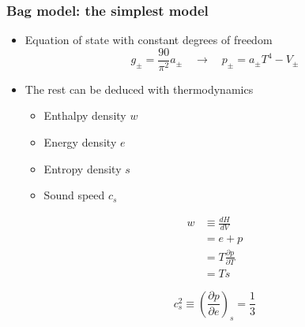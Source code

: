 \begin{frame}
    \frametitle{Bag model: the simplest model}
    \begin{itemize}
        \item Equation of state with constant degrees of freedom
        \begin{equation}
            g_\pm = \frac{90}{\pi^2} a_\pm \quad \rightarrow \quad p_\pm = a_\pm T^4 - V_\pm
        \end{equation}
        \item The rest can be deduced with thermodynamics \\
        \begin{minipage}[t]{0.33\linewidth}
            \begin{itemize}
                \item Enthalpy density $w$
                \item Energy density $e$
                \item Entropy density $s$
                \item Sound speed $c_s$
            \end{itemize}%
        \end{minipage}%
        \hfill%
        \begin{minipage}[t]{0.33\linewidth}%
            \begin{align*}
                w
                &\equiv \frac{dH}{dV} \\
                &= e+p \\
                &= T \frac{\partial p}{\partial T} \\
                &= Ts
            \end{align*}
        \end{minipage}
        \hfill%
        \begin{minipage}[t]{0.33\linewidth}
            \begin{equation}
                c_s^2 \equiv \left( \frac{\partial p}{\partial e} \right)_s = \frac{1}{3}
            \end{equation}
        \end{minipage}
    \end{itemize}
\end{frame}

